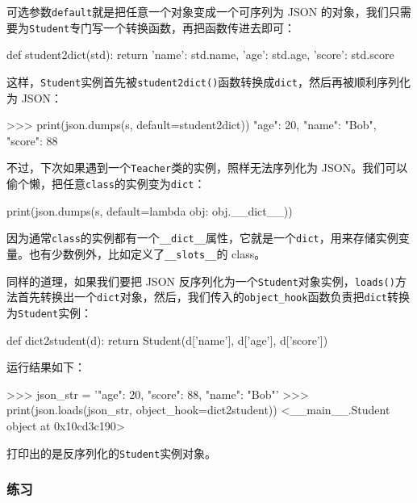 可选参数\texttt{default}就是把任意一个对象变成一个可序列为 JSON
的对象，我们只需要为\texttt{Student}专门写一个转换函数，再把函数传进去即可：

\begin{pythoncode}
def student2dict(std):
    return {
        'name': std.name,
        'age': std.age,
        'score': std.score
    }
\end{pythoncode}

这样，\texttt{Student}实例首先被\texttt{student2dict()}函数转换成\texttt{dict}，然后再被顺利序列化为
JSON：

\begin{pythoncode}
>>> print(json.dumps(s, default=student2dict))
{"age": 20, "name": "Bob", "score": 88}
\end{pythoncode}

不过，下次如果遇到一个\texttt{Teacher}类的实例，照样无法序列化为
JSON。我们可以偷个懒，把任意\texttt{class}的实例变为\texttt{dict}：

\begin{pythoncode}
print(json.dumps(s, default=lambda obj: obj.__dict__))
\end{pythoncode}

因为通常\texttt{class}的实例都有一个\texttt{\_\_dict\_\_}属性，它就是一个\texttt{dict}，用来存储实例变量。也有少数例外，比如定义了\texttt{\_\_slots\_\_}的
class。

同样的道理，如果我们要把 JSON
反序列化为一个\texttt{Student}对象实例，\texttt{loads()}方法首先转换出一个\texttt{dict}对象，然后，我们传入的\texttt{object\_hook}函数负责把\texttt{dict}转换为\texttt{Student}实例：

\begin{pythoncode}
def dict2student(d):
    return Student(d['name'], d['age'], d['score'])
\end{pythoncode}

运行结果如下：

\begin{pythoncode}
>>> json_str = '{"age": 20, "score": 88, "name": "Bob"}'
>>> print(json.loads(json_str, object_hook=dict2student))
<__main__.Student object at 0x10cd3c190>
\end{pythoncode}

打印出的是反序列化的\texttt{Student}实例对象。

\hypertarget{ux7ec3ux4e60}{%
\subsubsection{练习}\label{ux7ec3ux4e60}}

